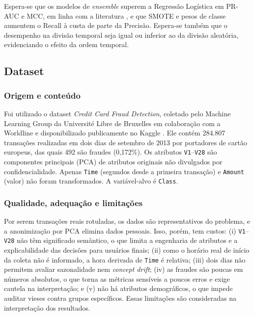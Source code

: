 \documentclass[12pt]{article}
\begin{document}
Espera-se que os modelos de \emph{ensemble} superem a Regressão Logística em
PR-AUC e MCC, em linha com a literatura \cite{bhattacharyya:2011,varmedja:2019},
e que SMOTE e pesos de classe aumentem o Recall à custa de parte da Precisão.
Espera-se também que o desempenho na divisão temporal seja igual ou inferior ao
da divisão aleatória, evidenciando o efeito da ordem temporal.

\subsection{Dataset}\label{sec:dataset}

\subsubsection{Origem e conteúdo}

Foi utilizado o dataset \emph{Credit Card Fraud Detection}, coletado pelo
Machine Learning Group da Université Libre de Bruxelles em colaboração com a
Worldline e disponibilizado publicamente no Kaggle
\cite{kaggle:ulb,dalpozzolo:2015}. Ele contém 284.807 transações realizadas em
dois dias de setembro de 2013 por portadores de cartão europeus, das quais 492
são fraudes (0,172\%). Os atributos \texttt{V1}--\texttt{V28} são componentes
principais (PCA) de atributos originais não divulgados por confidencialidade.
Apenas \texttt{Time} (segundos desde a primeira transação) e \texttt{Amount}
(valor) não foram transformados. A variável-alvo é \texttt{Class}.

\subsubsection{Qualidade, adequação e limitações}

Por serem transações reais rotuladas, os dados são representativos do
problema, e a anonimização por PCA elimina dados pessoais. Isso, porém, tem
custos: (i) \texttt{V1}--\texttt{V28} não têm significado semântico, o que
limita a engenharia de atributos e a explicabilidade das decisões para
usuários finais; (ii) como o horário real de início da coleta não é informado,
a hora derivada de \texttt{Time} é relativa; (iii) dois dias não permitem
avaliar sazonalidade nem \emph{concept drift}; (iv) as fraudes são poucas em
números absolutos, o que torna as métricas sensíveis a poucos erros e exige
cautela na interpretação; e (v) não há atributos demográficos, o que impede
auditar vieses contra grupos específicos. Essas limitações são consideradas na
interpretação dos resultados.
\end{document}
